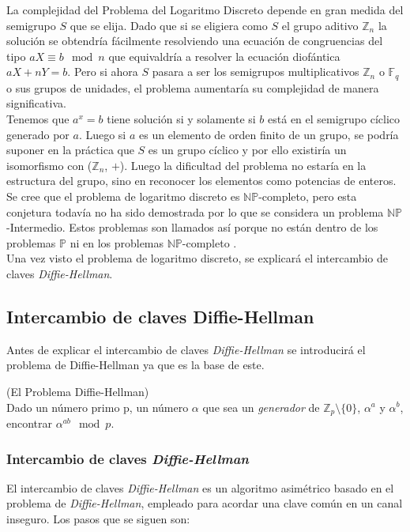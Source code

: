 La complejidad del Problema del Logaritmo Discreto depende en gran medida del semigrupo $S$ que se elija.
Dado que si se eligiera como $S$ el grupo aditivo $\mathbb{Z}_n$ la solución se obtendría fácilmente resolviendo una ecuación de congruencias del tipo $aX \equiv b \mod n$ que equivaldría a resolver la ecuación diofántica $aX + nY = b$. Pero si ahora $S$ pasara a ser los semigrupos multiplicativos $\mathbb{Z}_n$ o $\mathbb{F}_q$ o sus grupos de unidades, el problema aumentaría su complejidad de manera significativa.\\
Tenemos que $a^x = b$ tiene solución si y solamente si $b$ está en el semigrupo cíclico generado por $a$. Luego si $a$ es un elemento de orden finito de un grupo, se podría suponer en la práctica que $S$ es un grupo cíclico y por ello existiría un isomorfismo con ($\mathbb{Z}_n$, $+$). Luego la dificultad del problema no estaría en la estructura del grupo, sino en reconocer los elementos como potencias de enteros.\\
Se cree que el problema de logaritmo discreto es $\mathbb{NP}$-completo, pero esta conjetura todavía no ha sido demostrada por lo que se considera un problema $\mathbb{NP}$-Intermedio. Estos problemas son llamados así porque no están dentro de los problemas $\mathbb{P}$ ni en los problemas $\mathbb{NP}$-completo \cite{NP-intermedio}.\\
Una vez visto el problema de logaritmo discreto, se explicará el intercambio de claves \emph{Diffie-Hellman}.
\subsection{Intercambio de claves Diffie-Hellman}
Antes de explicar el intercambio de claves \emph{Diffie-Hellman} se introducirá el problema de Diffie-Hellman ya que es la base de este.\\

\begin{definicion}
		(El Problema Diffie-Hellman)\\ Dado un número primo p, un número $\alpha$ que sea un \emph{generador} de $\mathbb{Z}_{p}\setminus\{0\}$, $\alpha^a$ y $\alpha^b$, encontrar $\alpha^{ab} \mod p$.  
\end{definicion}

\subsubsection{Intercambio de claves \emph{Diffie-Hellman}}
El intercambio de claves \emph{Diffie-Hellman} es un algoritmo asimétrico basado en el problema de \emph{Diffie-Hellman}, empleado para acordar una clave común en un canal inseguro. Los pasos que se siguen son:

